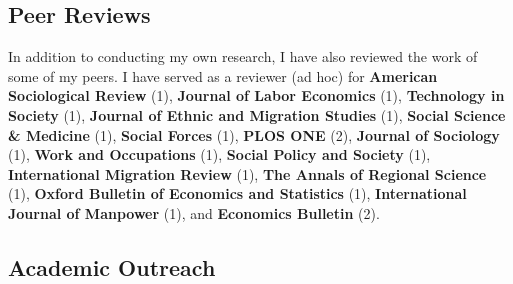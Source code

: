 \documentclass[11pt,a4paper,]{awesome-cv}
\begin{document}
\medskip

\hypertarget{peer-reviews}{%
\subsection{Peer Reviews}\label{peer-reviews}}

\footnotesize

In addition to conducting my own research, I have also reviewed the work
of some of my peers. I have served as a reviewer (ad hoc) for
\textbf{American Sociological Review} (1), \textbf{Journal of Labor
Economics} (1), \textbf{Technology in Society} (1), \textbf{Journal of
Ethnic and Migration Studies} (1), \textbf{Social Science \& Medicine}
(1), \textbf{Social Forces} (1), \textbf{PLOS ONE} (2), \textbf{Journal
of Sociology} (1), \textbf{Work and Occupations} (1), \textbf{Social
Policy and Society} (1), \textbf{International Migration Review} (1),
\textbf{The Annals of Regional Science} (1), \textbf{Oxford Bulletin of
Economics and Statistics} (1), \textbf{International Journal of
Manpower} (1), and \textbf{Economics Bulletin} (2). \normalsize

\medskip

\hypertarget{academic-outreach}{%
\subsection{Academic Outreach}\label{academic-outreach}}
\end{document}
